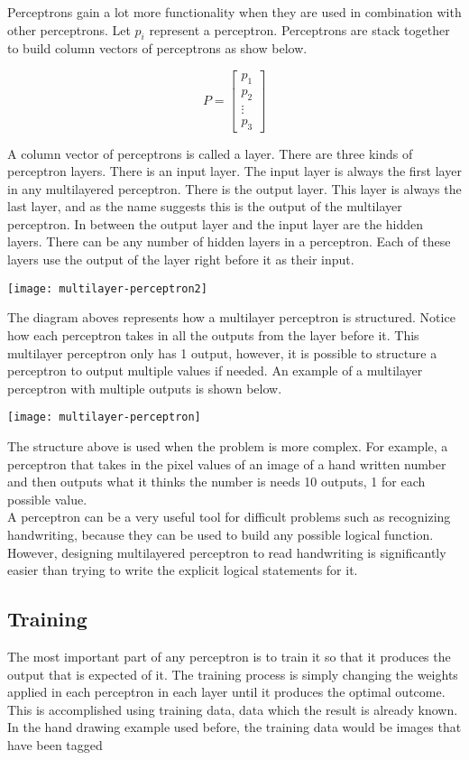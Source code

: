 Perceptrons gain a lot more functionality when they are used in combination with other perceptrons. Let $p_i$ represent a perceptron. Perceptrons are stack together to build column vectors of perceptrons as show below.

$$
	P = \begin{bmatrix}
		p_1 \\
		p_2 \\
		\vdots \\
		p_3
	\end{bmatrix}
$$

A column vector of perceptrons is called a layer. There are three kinds of perceptron layers. There is an input layer. The input layer is always the first layer in any multilayered perceptron. There is the output layer. This layer is always the last layer, and as the name suggests this is the output of the multilayer perceptron. In between the output layer and the input layer are the hidden layers. There can be any number of hidden layers in a perceptron. Each of these layers use the output of the layer right before it as their input.

\begin{center}
	\texttt{[image: multilayer-perceptron2]}
\end{center}

The diagram aboves represents how a multilayer perceptron is structured. Notice how each perceptron takes in all the outputs from the layer before it. This multilayer perceptron only has 1 output, however, it is possible to structure a perceptron to output multiple values if needed. An example of a multilayer perceptron with multiple outputs is shown below.

\begin{center}
	\texttt{[image: multilayer-perceptron]}
\end{center}

The structure above is used when the problem is more complex. For example, a perceptron that takes in the pixel values of an image of a hand written number and then outputs what it thinks the number is needs 10 outputs, 1 for each possible value. \\

A perceptron can be a very useful tool for difficult problems such as recognizing handwriting, because they can be used to build any possible logical function. However, designing multilayered perceptron to read handwriting is significantly easier than trying to write the explicit logical statements for it.

\subsection{Training}

The most important part of any perceptron is to train it so that it produces the output that is expected of it. The training process is simply changing the weights applied in each perceptron in each layer until it produces the optimal outcome. This is accomplished using training data, data which the result is already known. In the hand drawing example used before, the training data would be images that have been tagged 